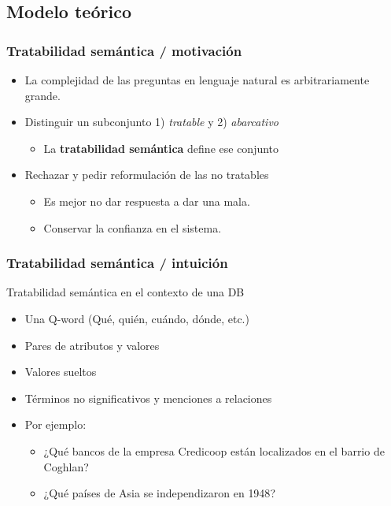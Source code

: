 \subsection{Modelo teórico}


\begin{frame}[<+->]
  \frametitle{Tratabilidad semántica / motivación}
      \begin{itemize}
          \item La complejidad de las preguntas en lenguaje natural es arbitrariamente grande.
          \item Distinguir un subconjunto 1) \textit{tratable} y 2) \textit{abarcativo}
          \begin{itemize}
            \item La {\color{blue}\textbf{tratabilidad semántica}} define ese conjunto
          \end{itemize}
          \item Rechazar y pedir reformulación de las no tratables
          \begin{itemize}
            \item Es mejor no dar respuesta a dar una mala. 
            \item Conservar la confianza en el sistema.
          \end{itemize}
      \end{itemize}
\end{frame}

\begin{frame}[<+->]
  \frametitle{Tratabilidad semántica / intuición}
    \begin{block}{Tratabilidad semántica en el contexto de una DB}
      \begin{itemize}
          \item Una {\color{green}Q-word} (Qué, quién, cuándo, dónde, etc.)
          \item Pares de {\color{blue}atributos} y {\color{blue}valores}
          \item {\color{purple}Valores} sueltos
          \item Términos no significativos y {\color{orange}menciones a relaciones}
          \item Por ejemplo:
            \begin{itemize}
              \item ¿{\color{green}Qué} {\color{orange}bancos} de la {\color{red}empresa Credicoop} están localizados en el {\color{blue}barrio} de {\color{blue}Coghlan}?
              \item ¿{\color{green}Qué} {\color{orange}países} de {\color{purple}Asia} se {\color{blue}independizaron} en {\color{blue}1948}?
            \end{itemize}
      \end{itemize}
    \end{block}
\end{frame}

